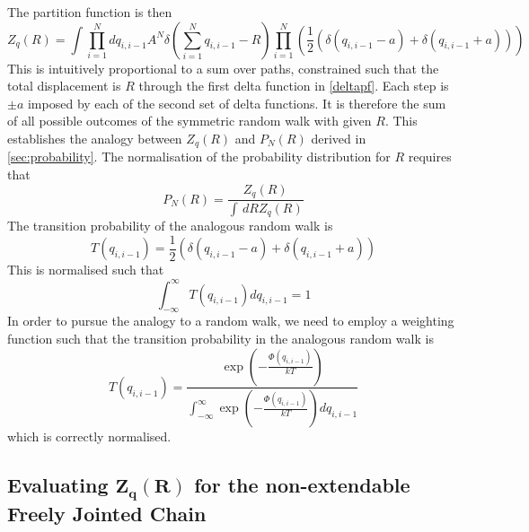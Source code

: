 %
The partition function is then
%
\begin{equation}\label{deltapf}
Z_{q}\left(R\right) = \int\prod^{N}_{i=1} dq_{i,i-1}A^{N}\delta\left(\sum_{i=1}^{N}q_{i,i-1} - R\right)\prod_{i=1}^{N}\left( \frac{1}{2}\left( \delta\left(q_{i,i-1}-a \right) + \delta\left(q_{i,i-1}+a \right)   \right)\right)
\end{equation}
%
This is intuitively proportional to a sum over paths, constrained such that the total displacement is $R$ through the first delta function in \eqref{deltapf}. Each step is $\pm a$ imposed by each of the second set of delta functions. It is therefore the sum of all possible outcomes of the symmetric random walk with given $R$. This establishes the analogy between $Z_{q}\left(R\right)$ and $P_{N}\left(R\right)$ derived in \ref{sec:probability}. The normalisation of the probability distribution for $R$ requires that
%
\begin{equation}
P_{N}\left(R \right)= \frac{Z_{q}\left(R\right)}{\int\,dR Z_{q}\left(R\right)}
\end{equation}
%
The transition probability of the analogous random walk is 
%
\begin{equation}
T\left(q_{i,i-1}\right)=  \frac{1}{2}\left( \delta\left(q_{i,i-1}-a \right)+ \delta\left(q_{i,i-1}+a \right)\right)  
\end{equation}
%
This is normalised such that 
%
\begin{equation}
\int^{\infty}_{-\infty}T\left(q_{i,i-1}\right)dq_{i,i-1} = 1
\end{equation}
%
In order to pursue the analogy to a random walk, we need to employ a weighting function such that the transition probability in the analogous random walk is
%
\begin{equation}
T\left(q_{i,i-1}\right)=\frac{\exp \left(-\frac{\Phi\left(q_{i,i-1}\right)}{kT}\right)}{\int^{\infty}_{-\infty} \exp \left( -\frac{\Phi\left(q_{i,i-1}\right)}{kT} \right) dq_{i,i-1}}
\end{equation}
%
which is correctly normalised.


\subsection{Evaluating $\boldsymbol{{Z_{q}\left(R\right)}}$ for the non-extendable Freely Jointed Chain}

